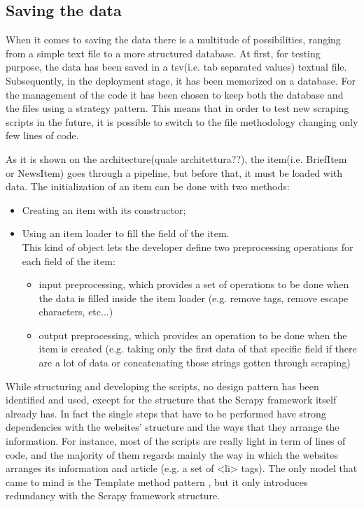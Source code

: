 \subsection{Saving the data}
When it comes to saving the data there is a multitude of possibilities, ranging from a simple text file to a more structured database. 
At first, for testing purpose, the data has been saved in a tsv(i.e. tab separated values) textual file. Subsequently, in the deployment stage, it has been memorized on a database. For the management of the code it has been chosen to keep both the database and the files using a strategy pattern. This means that in order to test new scraping scripts in the future, it is possible to switch to the file methodology changing only few lines of code. 
\par
As it is shown on the architecture(quale architettura??), the item(i.e. BriefItem or NewsItem) goes through a pipeline, but before that, it must be loaded with data.
The initialization of an item can be done with two methods:
\begin{itemize}
	\item Creating an item with its constructor;
	\item Using an item loader to fill the field of the item.\\
	This kind of object lets the developer define two preprocessing operations for each field of the item:
	\begin{itemize}
		\item input preprocessing, which provides a set of operations to be done when the data is filled inside the item loader (e.g. remove tags, remove escape characters, etc...)
		\item output preprocessing, which provides an operation to be done when the item is created (e.g. taking only the first data of that specific field if there are a lot of data or concatenating those strings gotten through scraping)
	\end{itemize}
\end{itemize}
\par While structuring and developing the scripts, no design pattern has been identified and used, except for the structure that the Scrapy framework itself already has. In fact the single steps that have to be performed have strong dependencies with  the websites' structure and the ways that they arrange the information. For instance, most of the scripts are really light in term of lines of code, and the majority of them regards mainly the way in which the websites arranges its information and article (e.g. a set of <li> tags). The only model that came to mind is the Template method pattern \cite{templatepattern}, but it only introduces redundancy with the Scrapy framework structure. 


